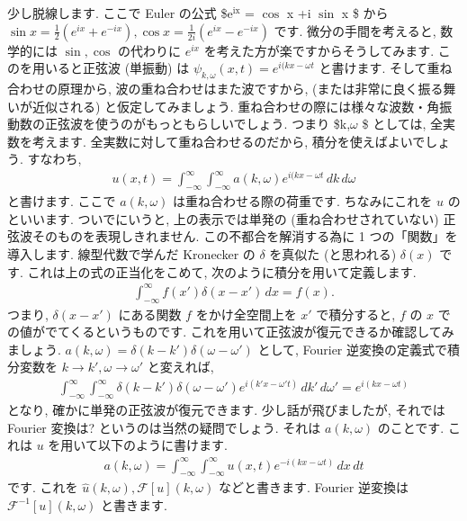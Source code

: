 \documentclass[openany, a4paper, oneside]{jsbook}
\begin{document}
少し脱線します. ここで Euler の公式
\$e$^{\text{ix}}$ = $\cos$ x +i $\sin$ x \$
から
$\sin x = \frac{1} {2} ( e^{ix} + e^{-ix} ),\cos x = \frac{1} {2i} ( e^{ix} - e^{-ix} )$
です.
微分の手間を考えると, 数学的には $\sin,\cos$ の代わりに $e^{ix}$ を考えた方が楽ですからそうしてみます.
このを用いると正弦波 (単振動) は
$\psi _{k , \omega } (x,t) = e^{i (kx - \omega t}$
と書けます.
そして重ね合わせの原理から, 波の重ね合わせはまた波ですから,
(または非常に良く振る舞いが近似される) と仮定してみましょう.
重ね合わせの際には様々な波数・角振動数の正弦波を使うのがもっともらしいでしょう.
つまり \$k,$\omega$ \$ としては, 全実数を考えます.
全実数に対して重ね合わせるのだから, 積分を使えばよいでしょう. すなわち,
\begin{align}
u (x,t)
=
\int _{-\infty} ^{\infty} \int _{-\infty} ^{\infty} a (k , \omega ) e^{i (kx - \omega t} \, d k \, d\omega
\end{align}
と書けます.
ここで $a (k,\omega)$ は重ね合わせる際の荷重です.
ちなみにこれを $u$ のといいます.
ついでにいうと, 上の表示では単発の (重ね合わせされていない) 正弦波そのものを表現しきれません.
この不都合を解消する為に 1 つの「関数」を導入します. 線型代数で学んだ Kronecker の $\delta$ を真似た (と思われる)
$\delta (x)$ です. これは上の式の正当化をこめて, 次のように積分を用いて定義します.
\begin{align}
\int _{-\infty} ^{\infty} f (x') \delta (x - x' ) \, dx
=
f (x).
\end{align}
つまり,
$\delta (x - x')$
にある関数 $f$ をかけ全空間上を $x'$ で積分すると,  $f$ の $x$ での値がでてくるというものです.
これを用いて正弦波が復元できるか確認してみましょう.
$a (k, \omega) = \delta (k-k') \delta (\omega - \omega ' )$ として,
Fourier 逆変換の定義式で積分変数を $k\to k', \omega \to \omega '$ と変えれば,
\begin{align}
\int _{-\infty} ^{\infty} \int _{-\infty} ^{\infty}
\delta (k-k') \delta (\omega - \omega ' ) e^{i (k' x - \omega' t)} \, d k' \, d\omega '
=
e^{i (kx - \omega t)}
\end{align}
となり, 確かに単発の正弦波が復元できます.
少し話が飛びましたが, それでは Fourier 変換は? というのは当然の疑問でしょう.
それは $a (k,\omega )$ のことです. これは $u$ を用いて以下のように書けます.
\begin{align}
a (k , \omega )
=
\int _{-\infty} ^{\infty}\int _{-\infty} ^{\infty} u (x,t) e^{-i (kx - \omega t)} \, dx \, dt
\end{align}
です. これを $\hat {u} (k,\omega ), \mathcal{F}[u] (k,\omega)$ などと書きます.
Fourier 逆変換は $\mathcal{F}^{-1}[u] (k,\omega)$ と書きます.
\end{document}
